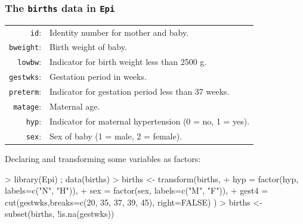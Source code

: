 \documentclass[12pt,dvipsnames,t,handout%
,aspectratio=169%
]{beamer}
\begin{document}
\begin{frame}[fragile]\frametitle{The \texttt{births} data in {\tt Epi}}

{\small
\begin{tabular}{rl}
            {\tt id}: & Identity number for mother and baby.\\
       {\tt bweight}: & Birth weight of baby.\\
        {\tt lowbw}: & Indicator for birth weight less than 2500 g.\\
       {\tt gestwks}: & Gestation period in weeks.\\
       {\tt preterm}: & Indicator for gestation period less than 37 weeks.\\
        {\tt matage}: & Maternal age.\\
         {\tt  hyp}: & Indicator for maternal hypertension (0 = no, 1 = yes).\\
          {\tt sex}: & Sex of baby (1 = male, 2 = female).
\end{tabular}
}

\medskip
Declaring and transforming some variables as factors:

{\small
\begin{Schunk}
\begin{Sinput}
> library(Epi) ; data(births)
> births <- transform(births,
+    hyp = factor(hyp, labels=c("N", "H")),
+    sex = factor(sex, labels=c("M", "F")),
+    gest4 = cut(gestwks,breaks=c(20, 35, 37, 39, 45), right=FALSE)  )
> births <- subset(births, !is.na(gestwks))	
\end{Sinput}
\end{Schunk}
}
\vfill
\end{frame}
\end{document}
